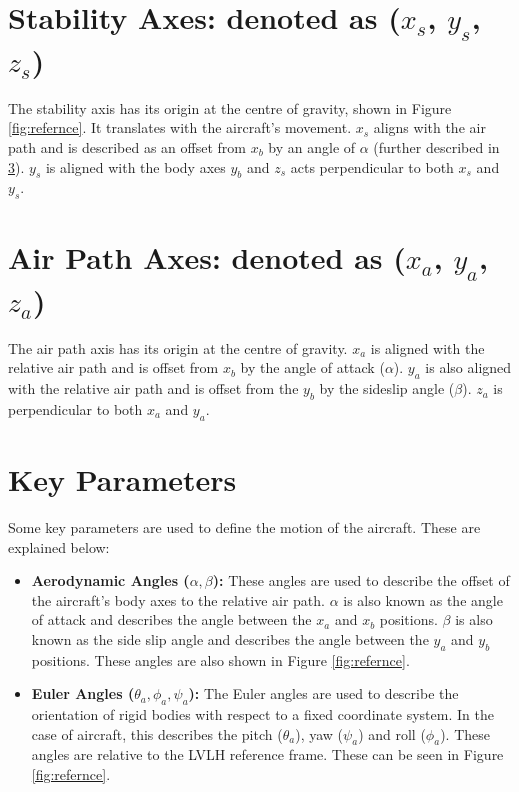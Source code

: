 \section{Stability Axes: denoted as \texorpdfstring{($x_s$, $y_s$, $z_s$)}{L}} 
The stability axis has its origin at the centre of gravity, shown in Figure \ref{fig:refernce}. It translates with the aircraft's movement. $x_s$ aligns with the air path and is described as an offset from $x_b$ by an angle of $\alpha$ (further described in \ref{subsubsec:keyparam}). $y_s$ is aligned with the body axes $y_b$ and $z_s$ acts perpendicular to both $x_s$ and $y_s$.


\section{Air Path Axes: denoted as \texorpdfstring{($x_a$, $y_a$, $z_a$)}{L}}
The air path axis has its origin at the centre of gravity. $x_a$ is aligned with the relative air path and is offset from $x_b$ by the angle of attack ($\alpha$). $y_a$ is also aligned with the relative air path and is offset from the $y_b$ by the sideslip angle ($\beta$). $z_a$ is perpendicular to both $x_a$ and $y_a$. 

\section{Key Parameters}
\label{subsubsec:keyparam}
Some key parameters are used to define the motion of the aircraft. These are explained below: 
\begin{itemize}
    \item \textbf{Aerodynamic Angles ($\alpha, \beta$):} These angles are used to describe the offset of the aircraft's body axes to the relative air path. $\alpha$ is also known as the angle of attack and describes the angle between the $x_a$ and $x_b$ positions. $\beta$ is also known as the side slip angle and describes the angle between the $y_a$ and $y_b$ positions. These angles are also shown in Figure \ref{fig:refernce}.
    \item \textbf{Euler Angles ($\theta_a, \phi_a, \psi_a $):} The Euler angles are used to describe the orientation of rigid bodies with respect to a fixed coordinate system. In the case of aircraft, this describes the pitch ($\theta_a$), yaw ($\psi_a$) and roll ($\phi_a$). These angles are relative to the LVLH reference frame. These can be seen in Figure \ref{fig:refernce}.
\end{itemize}


